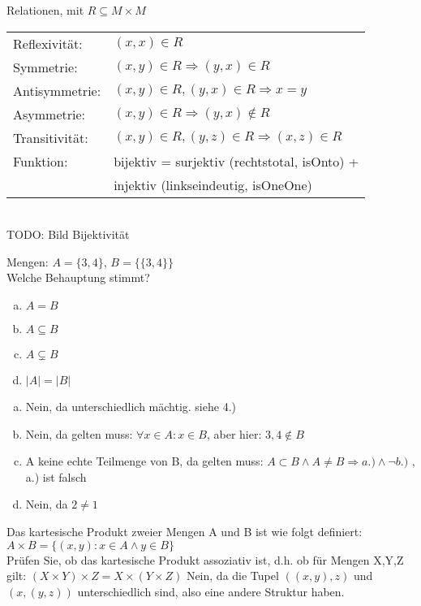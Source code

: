 \begin{card}
	Relationen, mit $R \subseteq M \times M$\\
	\begin{tabular}{ll}
		Reflexivität:& $(x, x) \in R $\\
		Symmetrie:&	$(x, y) \in R \Rightarrow (y, x) \in R$\\
		Antisymmetrie:& $(x, y) \in R, (y, x) \in R \Rightarrow x=y$\\
		Asymmetrie:& $(x, y) \in R \Rightarrow (y, x) \notin R$\\
		Transitivität:& $(x, y) \in R, (y, z) \in R \Rightarrow (x, z) \in R$\\
		Funktion: & bijektiv = surjektiv (rechtstotal, isOnto) +\\
	     	      & injektiv (linkseindeutig, isOneOne)
		\end{tabular}
		\\
		TODO: Bild Bijektivität
\end{card}

\begin{card}
	Mengen: $A = \{3, 4\}$, $B = \{\{3, 4\}\}$\\Welche Behauptung stimmt?
	\begin{enumerate}[a)]
	\item $A = B$
	\item $A \subseteq B$
	\item $A \subsetneq B$
	\item $|A| = |B|$
	\end{enumerate}
	\hr
	\begin{enumerate}[a)]
	\item Nein, da unterschiedlich mächtig. siehe 4.)
	\item Nein, da gelten muss: $\forall x \in A: x \in B$, aber hier: $3,4 \notin B$ 
	\item A keine echte Teilmenge von B, da gelten muss: $A \subset B \land A \neq B \Rightarrow a.) \land \lnot b.)$ , a.) ist falsch
	\item Nein, da $2 \neq 1$
	\end{enumerate}
\end{card}

\begin{card}
	Das kartesische Produkt zweier Mengen A und B ist wie folgt definiert:
	$A \times B = \{(x,y):x	\in	A \land	y \in B\}$\\
	Prüfen Sie, ob das kartesische Produkt assoziativ ist, d.h. ob für Mengen X,Y,Z gilt:
	$(X	\times Y)\times Z=X \times(Y \times Z)$
	\hr
	Nein, da die Tupel $((x,y),z)$ und $(x,(y,z))$ unterschiedlich sind, also eine andere Struktur haben.
\end{card}

